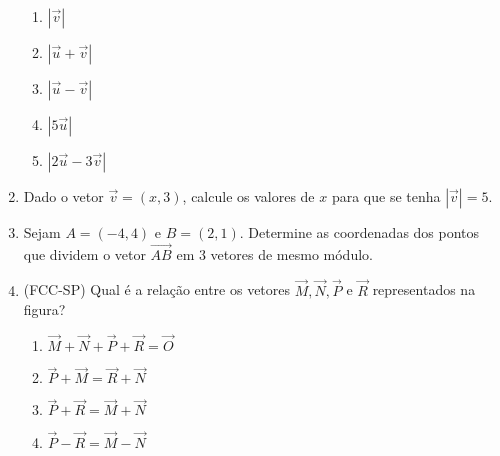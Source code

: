 \begin{enumerate}
\begin{enumerate}
\item {} 
\(|\vec{v}|\)

\item {} 
\(|\vec{u}+\vec{v}|\)

\item {} 
\(|\vec{u}-\vec{v}|\)

\item {} 
\(|5\vec{u}|\)

\item {} 
\(|2\vec{u}-3\vec{v}|\)

\end{enumerate}

\item Dado o vetor \(\vec{v}=(x,3)\), calcule os valores de \(x\) para que se tenha \(|\vec{v}|=5\).

\item Sejam \(A=(-4,4)\) e \(B=(2,1)\). Determine as coordenadas dos pontos que dividem o vetor \(\overrightarrow{AB}\) em 3 vetores de mesmo módulo.

\item (FCC-SP) Qual é a relação entre os vetores \(\vec{M}, \vec{N}, \vec{P}\) e \(\vec{R}\) representados na figura?
\begin{quote}
\begin{center}\end{center}\end{quote}
\begin{enumerate}
\item {} 
\(\vec{M} + \vec{N} + \vec{P} + \vec{R} = \vec{O}\)

\item {} 
\(\vec{P} + \vec{M} = \vec{R} + \vec{N}\)

\item {} 
\(\vec{P} + \vec{R} = \vec{M} + \vec{N}\)

\item {} 
\(\vec{P} - \vec{R} = \vec{M} - \vec{N}\)


\end{enumerate}
\end{enumerate}
